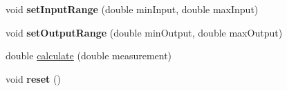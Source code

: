 \begin{DoxyCompactItemize}
\item 
\mbox{\label{classfrc_1_1robot_1_1controller_1_1_take_back_half_abe2643dbfad710cf0c304a653b6845f2}} 
void {\bfseries set\+Input\+Range} (double min\+Input, double max\+Input)
\item 
\mbox{\label{classfrc_1_1robot_1_1controller_1_1_take_back_half_a77cc71c9177702753fe30035bd0bc4b7}} 
void {\bfseries set\+Output\+Range} (double min\+Output, double max\+Output)
\item 
double \mbox{\hyperlink{classfrc_1_1robot_1_1controller_1_1_take_back_half_a9efd4ffb736db38bb125fc80a5a72740}{calculate}} (double measurement)
\item 
\mbox{\label{classfrc_1_1robot_1_1controller_1_1_take_back_half_a873fc8c611d63768fe30676da6d12f7f}} 
void {\bfseries reset} ()
\end{DoxyCompactItemize}
